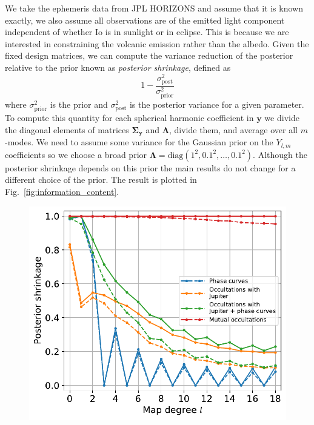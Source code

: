 \documentclass[modern]{aastex62}
\begin{document}
We take the ephemeris data  from \textsf{JPL HORIZONS} and assume that it is known exactly, we also assume all observations are of the emitted light component independent of whether Io is in sunlight or in eclipse.
This is because we are interested in constraining the volcanic emission rather than the albedo.
Given the fixed design matrices, we can compute the variance reduction of the posterior relative to the prior known as \emph{posterior shrinkage}, defined as
\begin{equation}
    1-\frac{\sigma^2_\mathrm{post}}{\sigma^2_\mathrm{prior}}
\end{equation}
where $\sigma^2_\mathrm{prior}$ is the prior and $\sigma^2_\mathrm{post}$ is the posterior variance for a given parameter.
To compute this quantity for each spherical harmonic coefficient in $\mathbf{y}$ we divide the diagonal elements of matrices $\boldsymbol{\Sigma}_{\hat{\mathbf{y}}}$ and $\boldsymbol{\Lambda}$, divide them, and average over all $m$-modes. 
We need to assume some variance for the Gaussian prior on the $Y_{l,m}$ coefficients so we choose a broad prior $\boldsymbol{\Lambda}=\mathrm{diag}(1^2,0.1^2,\dots,0.1^2)$.
Although the posterior shrinkage depends on this prior the main results do not change for a different choice of the prior.
The result is plotted in Fig.~\ref{fig:information_content}.
\begin{figure}[h!]
    \begin{centering}
    \includegraphics[width=0.5\linewidth]{figures/information_content.pdf}
    \end{centering}
\end{figure}
\end{document}
